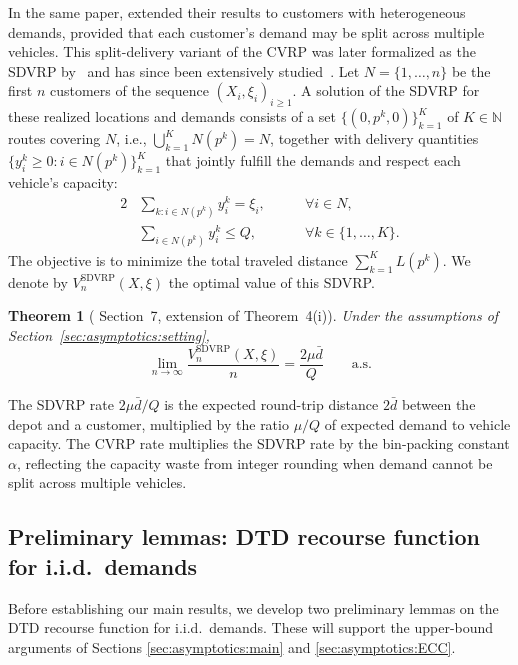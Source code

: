 \documentclass{article}
\newtheorem{theorem}{Theorem}
\begin{document}
{In the same paper, \cite{haimovich1985bounds} extended their results to customers with heterogeneous demands, provided that each customer's demand may be split across multiple vehicles. This split-delivery variant of the CVRP was later formalized as the SDVRP by~\cite{dror1989savings} and has since been extensively studied~\cite{archetti2012vehicle}. Let $N = \{1, \dots, n\}$ be the first $n$ customers of the sequence $(X_i, \xi_i)_{i \geq 1}$. A solution of the SDVRP for these realized locations and demands consists of a set $\{(0, p^k, 0)\}_{k=1}^K$ of $K \in \mathbb{N}$ routes covering $N$, i.e., $\bigcup_{k=1}^K N(p^k) = N$, together with delivery quantities $\{y_i^k \geq 0 : i \in N(p^k)\}_{k=1}^K$ that jointly fulfill the demands and respect each vehicle's capacity:
\begingroup
\allowdisplaybreaks
\begin{alignat}{2}
    & \sum_{k : i \in N(p^k)} y_i^k = \xi_i, \qquad & \forall i \in N, \label{SDVRP:demands} \\
    & \sum_{i \in N(p^k)} y_i^k \leq Q, \qquad & \forall k \in \{1, \dots, K\}. \label{SDVRP:capacity}
\end{alignat}
\endgroup
The objective is to minimize the total traveled distance $\sum_{k=1}^K L(p^k)$. We denote by $V_n^{\text{SDVRP}}(X, \xi)$ the optimal value of this SDVRP. 
\begin{theorem}[\cite{haimovich1985bounds} Section~7, extension of Theorem~4(i)]\label{thm:haimovich_thm4}
    Under the assumptions of Section~\ref{sec:asymptotics:setting},
    \begin{equation}\label{eq:SDVRP_rate}
        \lim_{n \to \infty} \frac{V_n^{\text{SDVRP}}(X, \xi)}{n} = \frac{2\mu\bar d}{Q} \qquad \text{a.s.}
    \end{equation}
\end{theorem}

The SDVRP rate $2\mu\bar d/Q$ is the expected round-trip distance $2\bar d$ between the depot and a customer, multiplied by the ratio $\mu/Q$ of expected demand to vehicle capacity. The CVRP rate multiplies the SDVRP rate by the bin-packing constant $\alpha$, reflecting the capacity waste from integer rounding when demand cannot be split across multiple vehicles.

\subsection{Preliminary lemmas: DTD recourse function for i.i.d.\ demands}\label{sec:asymptotics:accounting}
Before establishing our main results, we develop two preliminary lemmas on the DTD recourse function for i.i.d.\ demands. These will support the upper-bound arguments of Sections \ref{sec:asymptotics:main} and \ref{sec:asymptotics:ECC}.

}
\end{document}
